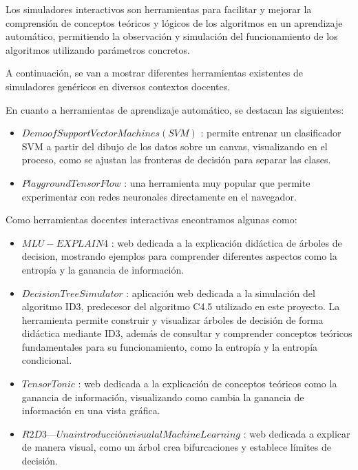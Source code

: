 
Los simuladores interactivos son herramientas para facilitar y mejorar la comprensión de conceptos teóricos y lógicos de los algoritmos en un aprendizaje automático, permitiendo la observación y simulación del funcionamiento de los algoritmos utilizando parámetros concretos.

A continuación, se van a mostrar diferentes herramientas existentes de simuladores genéricos en diversos contextos docentes.

En cuanto a herramientas de aprendizaje automático, se destacan las siguientes:
\begin{itemize}
    
    \item $Demo of Support Vector Machines (SVM)$ \cite{greitemann2018SVMdemo}: permite entrenar un clasificador SVM a partir del dibujo de los datos sobre un canvas, visualizando en el proceso, como se ajustan las fronteras de decisión para separar las clases.

    \item $Playground Tensor Flow$ \cite{smilkovCarterTensorFlowPlayground}: una herramienta muy popular que permite experimentar con redes neuronales directamente en el navegador.
    
\end{itemize}

Como herramientas docentes interactivas encontramos algunas como:

\begin{itemize}

    \item $MLU-EXPLAIN4$ \cite{mluExplainDecisionTrees}: web dedicada a la explicación didáctica de árboles de decision, mostrando ejemplos para comprender diferentes aspectos como la entropía y la ganancia de información.
    
    \item $Decision Tree Simulator$ \cite{drefs2026DecisionTreeSimulator}: aplicación web dedicada a la simulación del algoritmo ID3, predecesor del algoritmo C4.5 utilizado en este proyecto. La herramienta permite construir y visualizar árboles de decisión de forma didáctica mediante ID3, además de consultar y comprender conceptos teóricos fundamentales para su funcionamiento, como la entropía y la entropía condicional.

    \item $TensorTonic$ \cite{tensorTonic2026InformationGain}: web dedicada a la explicación de conceptos teóricos como la ganancia de información, visualizando como cambia la ganancia de información en una vista gráfica.

    \item $R2D3 — Una introducción visual al Machine Learning$ \cite{yeeChu2015VisualIntroductionML}: web dedicada a explicar de manera visual, como un árbol crea bifurcaciones y establece límites de decisión.
    
\end{itemize}

